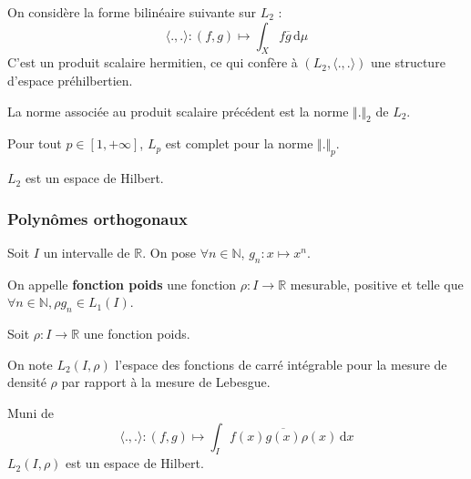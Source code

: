   \begin{definition}
    On considère la forme bilinéaire suivante sur $L_2$ :
    \[ \langle ., . \rangle : (f, g) \mapsto \int_X f \overline{g} \, \mathrm{d}\mu \]
    C'est un produit scalaire hermitien, ce qui confère à $(L_2, \langle ., . \rangle)$ une structure d'espace préhilbertien.
  \end{definition}

  \begin{remark}
    La norme associée au produit scalaire précédent est la norme $\Vert . \Vert_2$ de $L_2$.
  \end{remark}


  \begin{theorem}
    Pour tout $p \in [1, +\infty]$, $L_p$ est complet pour la norme $\Vert . \Vert_p$.
  \end{theorem}


  \begin{corollary}
    $L_2$ est un espace de Hilbert.
  \end{corollary}

  \subsubsection{Polynômes orthogonaux}


  Soit $I$ un intervalle de $\mathbb{R}$. On pose $\forall n \in \mathbb{N}$, $g_n : x \mapsto x^n$.

  \begin{definition}
    On appelle \textbf{fonction poids} une fonction $\rho : I \rightarrow \mathbb{R}$ mesurable, positive et telle que $\forall n \in \mathbb{N}, \rho g_n \in L_1(I)$.
  \end{definition}

  Soit $\rho : I \rightarrow \mathbb{R}$ une fonction poids.

  \begin{notation}
    On note $L_2(I, \rho)$ l'espace des fonctions de carré intégrable pour la mesure de densité $\rho$ par rapport à la mesure de Lebesgue.
  \end{notation}

  \begin{proposition}
    Muni de
    \[ \langle ., . \rangle : (f,g) \mapsto \int_I f(x) \overline{g(x)} \rho(x) \, \mathrm{d}x \]
    $L_2(I, \rho)$ est un espace de Hilbert.
  \end{proposition}

